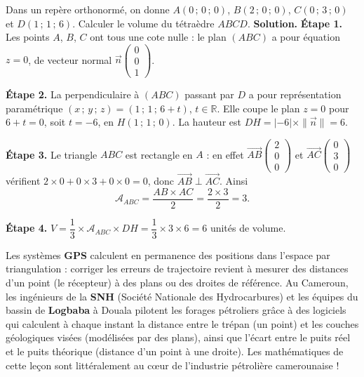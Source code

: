 \documentclass[11pt]{article}
\begin{document}
\begin{exoresolu}
Dans un repère orthonormé, on donne $A(0\,;\,0\,;\,0)$, $B(2\,;\,0\,;\,0)$, $C(0\,;\,3\,;\,0)$ et $D(1\,;\,1\,;\,6)$. Calculer le volume du tétraèdre $ABCD$.
\tcblower
\textbf{Solution.} \textbf{Étape 1.} Les points $A$, $B$, $C$ ont tous une cote nulle : le plan $(ABC)$ a pour équation $z = 0$, de vecteur normal $\vec{n}\begin{pmatrix} 0 \\ 0 \\ 1 \end{pmatrix}$.

\textbf{Étape 2.} La perpendiculaire à $(ABC)$ passant par $D$ a pour représentation paramétrique $(x\,;\,y\,;\,z) = (1\,;\,1\,;\,6+t)$, $t \in \mathbb{R}$. Elle coupe le plan $z = 0$ pour $6 + t = 0$, soit $t = -6$, en $H(1\,;\,1\,;\,0)$. La hauteur est $DH = |{-6}|\times\|\vec{n}\| = 6$.

\textbf{Étape 3.} Le triangle $ABC$ est rectangle en $A$ : en effet $\overrightarrow{AB}\begin{pmatrix} 2 \\ 0 \\ 0 \end{pmatrix}$ et $\overrightarrow{AC}\begin{pmatrix} 0 \\ 3 \\ 0 \end{pmatrix}$ vérifient $2\times 0 + 0\times 3 + 0\times 0 = 0$, donc $\overrightarrow{AB} \perp \overrightarrow{AC}$. Ainsi
\[ \mathcal{A}_{ABC} = \dfrac{AB \times AC}{2} = \dfrac{2 \times 3}{2} = 3. \]

\textbf{Étape 4.} $V = \dfrac{1}{3} \times \mathcal{A}_{ABC} \times DH = \dfrac{1}{3} \times 3 \times 6 = 6$ unités de volume.
\end{exoresolu}

\begin{savaistu}
Les systèmes \textbf{GPS} calculent en permanence des positions dans l'espace par triangulation : corriger les erreurs de trajectoire revient à mesurer des distances d'un point (le récepteur) à des plans ou des droites de référence. Au Cameroun, les ingénieurs de la \textbf{SNH} (Société Nationale des Hydrocarbures) et les équipes du bassin de \textbf{Logbaba} à Douala pilotent les forages pétroliers grâce à des logiciels qui calculent à chaque instant la distance entre le trépan (un point) et les couches géologiques visées (modélisées par des plans), ainsi que l'écart entre le puits réel et le puits théorique (distance d'un point à une droite). Les mathématiques de cette leçon sont littéralement au cœur de l'industrie pétrolière camerounaise !
\end{savaistu}
\end{document}
